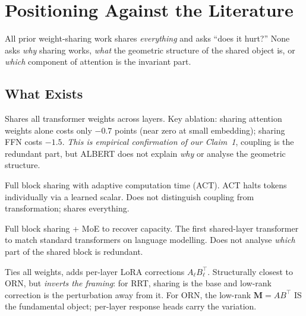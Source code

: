 \documentclass[11pt, a4paper]{article}
\newcommand{\M}{\mathbf{M}}
\theoremstyle{remark}
\begin{document}
\section{Positioning Against the Literature}

All prior weight-sharing work shares \emph{everything} and asks ``does it hurt?''
None asks \emph{why} sharing works, \emph{what} the geometric structure of the shared object is, or \emph{which} component of attention is the invariant part.

\subsection{What Exists}

\begin{description}[nosep, leftmargin=1.5em]
    \item[ALBERT~\cite{lan2020albert}:]
    Shares all transformer weights across layers.
    Key ablation: sharing attention weights alone costs only $-0.7$ points (near zero at small embedding); sharing FFN costs $-1.5$.
    \emph{This is empirical confirmation of our Claim~1}, coupling is the redundant part, but ALBERT does not explain \emph{why} or analyse the geometric structure.

    \item[Universal Transformer~\cite{dehghani2018universal}:]
    Full block sharing with adaptive computation time (ACT).
    ACT halts tokens individually via a learned scalar.
    Does not distinguish coupling from transformation; shares everything.

    \item[MoEUT~\cite{moeut2024}:]
    Full block sharing + MoE to recover capacity.
    The first shared-layer transformer to match standard transformers on language modelling.
    Does not analyse \emph{which} part of the shared block is redundant.

    \item[Relaxed Recursive Transformers~\cite{mol2025}:]
    Ties all weights, adds per-layer LoRA corrections $A_\ell B_\ell^\top$.
    Structurally closest to ORN, but \emph{inverts the framing}: for RRT, sharing is the base and low-rank correction is the perturbation away from it.
    For ORN, the low-rank $\M = AB^\top$ IS the fundamental object; per-layer response heads carry the variation.


\end{description}
\end{document}
